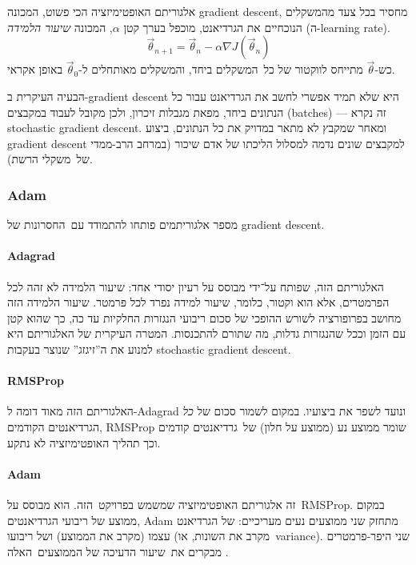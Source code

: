 \documentclass[hebrew, a4paper]{article}
\theoremstyle{plain}
\theoremstyle{definition}
\numberwithin{equation}{section}
\begin{document}
אלגוריתם האופטימיזציה הכי פשוט, המכונה gradient descent, מחסיר בכל צעד
מהמשקלים הנוכחיים את הגרדיאנט, מוכפל בערך קטן $\alpha$, המכונה
\emph{שיעור הלמידה} (ה-learning rate).
\[
  \vec{\theta}_{n+1} = \vec{\theta}_{n} - \alpha \nabla J(\vec{\theta}_n)
\]
כש-$\vec{\theta}$ מתייחס לווקטור של כל~המשקלים ביחד, והמשקלים מאותחלים
ל-$\vec{\theta}_0$ באופן אקראי.

הבעיה העיקרית ב-gradient descent היא שלא תמיד אפשרי לחשב את הגרדיאנט
עבור כל הנתונים ביחד, מפאת מגבלות זיכרון, ולכן מקובל לעבוד במקבצים
(batches) --- זה נקרא stochastic gradient descent. ומאחר שמקבץ לא מתאר
במדויק את כל הנתונים, ביצוע gradient descent למקבצים שונים נדמה למסלול
הליכתו של אדם שיכור (במרחב הרב-ממדי של~משקלי הרשת).

\subsubsection{Adam}
\label{sec:optimization-adam}

מספר אלגוריתמים פותחו להתמודד עם~החסרונות של gradient descent.

\paragraph{Adagrad}

האלגוריתם הזה, שפותח על־ידי  מבוסס על רעיון יסודי
אחד: שיעור הלמידה לא זהה לכל הפרמטרים, אלא הוא וקטור, כלומר, שיעור
למידה נפרד לכל פרמטר. שיעור הלמידה הזה מחושב בפרופורציה לשורש ההופכי
של סכום ריבועי הנגזרות החלקיות עד כה, כך שהוא קטן עם הזמן וככל
שהנגזרות גדלות, מה שתורם להתכנסות. המטרה העיקרית של האלגוריתם היא
למנוע את ה”זיגזג” שנוצר בעקבות stochastic gradient descent.

\paragraph{RMSProp}

האלגוריתם הזה מאוד דומה ל-Adagrad ונועד לשפר את ביצועיו. במקום לשמור
סכום של \emph{כל} הגרדיאנטים הקודמים, RMS\-Prop שומר ממוצע נע (ממוצע על
חלון) של~גרדיאנטים קודמים וכך תהליך האופטימיזציה לא נתקע.

\paragraph{Adam}

זה אלגוריתם האופטימיזציה שמשמש בפרויקט~הזה. הוא מבוסס על~RMSProp.
במקום ממוצע של ריבועי הגרדיאנטים, Adam מתחזק שני ממוצעים נעים
מעריכיים: של הגרדיאנט עצמו (מקרב את הממוצע) ושל ריבועו (מקרב את
השונות, או~variance). שני היפר-פרמטרים מבקרים את~שיעור הדעיכה של
הממוצעים~האלה .
\end{document}
